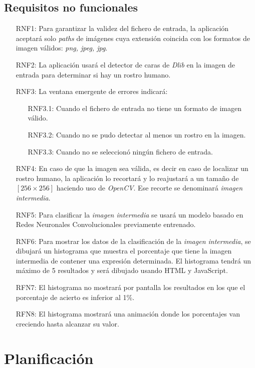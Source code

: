 \documentclass[a4paper,11pt]{book}
\begin{document}
\subsection{Requisitos no funcionales}
\begin{itemize}
	\item [RNF1:] Para garantizar la validez del fichero de entrada, la aplicación aceptará solo \textit{paths} de imágenes cuya extensión coincida con los formatos de imagen válidos: \textit{png, jpeg, jpg}.
	\item [RNF2:] La aplicación usará el detector de caras de \textit{Dlib} en la imagen de entrada para determinar si hay un rostro humano.
	\item [RNF3:] La ventana emergente de errores indicará:
	\begin{enumerate}
		\item [RNF3.1:] Cuando el fichero de entrada no tiene un formato de imagen válido.
		\item [RNF3.2:] Cuando no se pudo detectar al menos un rostro en la imagen.
		\item [RNF3.3:] Cuando no se seleccionó ningún fichero de entrada.
	\end{enumerate}
	\item [RNF4:] En caso de que la imagen sea válida, es decir en caso de localizar un rostro humano, la aplicación lo recortará y lo reajustará a un tamaño de \([256 \times 256]\) haciendo uso de \textit{OpenCV}. Ese recorte se denominará \textit{imagen intermedia}.
	\item [RNF5:] Para clasificar la \textit{imagen intermedia} se usará un modelo basado en Redes Neuronales Convolucionales previamente entrenado.
	\item [RNF6:] Para mostrar los datos de la clasificación de la \textit{imagen intermedia}, se dibujará un histograma que muestra el porcentaje que tiene la imagen intermedia de contener una expresión determinada. El histograma tendrá un máximo de 5 resultados y será dibujado usando HTML y JavaScript.
	\item [RFN7:] El histograma no mostrará por pantalla los resultados en los que el porcentaje de acierto es inferior al 1\%.
	\item [RFN8:] El histograma mostrará una animación donde los porcentajes van creciendo hasta alcanzar su valor.	
\end{itemize}

\section{Planificación}
\end{document}

